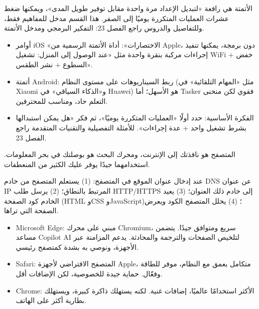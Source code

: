 
الأتمتة هي رافعة «لتبديل الإعداد مرة واحدة مقابل توفير طويل المدى»، ويمكنها ضغط عشرات العمليات المتكررة يوميًا إلى الصفر. هذا القسم مدخل للمفاهيم فقط، وللتفاصيل والدروس راجع الفصل 23: التفكير البرمجي ومدخل الأتمتة.

\begin{itemize}
  \item أوامر iOS «الاختصارات»: أداة الأتمتة الرسمية من Apple، دون برمجة، يمكنها تنفيذ إجراءات مركبة بنقرة واحدة مثل «عند الوصول إلى المنزل: تشغيل WiFi + خفض السطوع + نشر الطقس».
  \item أتمتة Android: ربط السيناريوهات على مستوى النظام (مثل «المهام التلقائية» في Xiaomi و«الذكاء السياقي» في Huawei) هو الأسهل؛ أما Tasker فقوي لكن منحنى التعلم حاد، ومناسب للمحترفين.
  \item الفكرة الأساسية: حدد أولًا «العمليات المتكررة يوميًا»، ثم فكر «هل يمكن استبدالها بشرط تشغيل واحد + عدة إجراءات». للأمثلة التفصيلية والتقنيات المتقدمة راجع الفصل 23.
\end{itemize}


المتصفح هو نافذتك إلى الإنترنت، ومحرك البحث هو بوصلتك في بحر المعلومات. استخدامهما جيدًا يوفر عليك الكثير من المنعطفات.


عند إدخال عنوان الموقع في المتصفح: (1) يستعلم المتصفح من خادم DNS عن عنوان IP المرتبط بالنطاق؛ (2) يرسل طلب HTTP/HTTPS إلى خادم ذلك العنوان؛ (3) يعيد الخادم كود الصفحة (HTML وCSS وJavaScript)؛ (4) يحلل المتصفح الكود ويعرض الصفحة التي تراها.


\begin{itemize}
  \item Microsoft Edge: مبني على محرك Chromium، سريع ومتوافق جيدًا. يتضمن مساعد Copilot AI لتلخيص الصفحات والترجمة والمحادثة. يدعم المزامنة عبر الأجهزة، ونوصي به بشدة كمتصفح رئيسي.
  \item Safari: المتصفح الافتراضي لأجهزة Apple، متكامل بعمق مع النظام، موفر للطاقة وفعّال. حماية جيدة للخصوصية، لكن الإضافات أقل.
  \item Chrome: الأكثر استخدامًا عالميًا، إضافات غنية. لكنه يستهلك ذاكرة كبيرة، ويستهلك بطارية أكثر على الهاتف.
\end{itemize}


